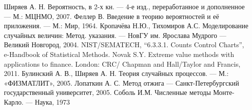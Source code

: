 


        
        
        \tableofcontents
        
        
        
        
        
        
        
        
        
        
        
        \begin{thebibliography}{9}
                Ширяев А. Н. Вероятность, в 2-х кн. --- 4-е изд., переработанное и дополненное --- М.: МЦНМО, 2007.
                 Феллер В. Введение в теорию вероятностей и её приложения. --- М.: Мир, 1964.
                 Кропачёва Н.Ю., Тихомиров А.С. Моделирование случайных величин: Метод. указания. --- НовГУ им. Ярослава Мудрого --- Великий Новгород, 2004.
                 NIST/SEMATECH, ``6.3.3.1. Counts Control Charts'', e-Handbook of Statistical Methods.
                 Novak S.Y. Extreme value methods with applications to finance. London: CRC/ Chapman and Hall/Taylor and Francis, 2011.
                 Булинский А. В., Ширяев А. Н. Теория случайных процессов. --- М.: «ФИЗМАТЛИТ», 2005.
                 Лопаткин А. С. Метод отжига --- Санкт-Петербургский государственный университет, 2005.
                 Соболь И.М. Численные методы Монте-Карло. --- Наука, 1973
        \end{thebibliography}

